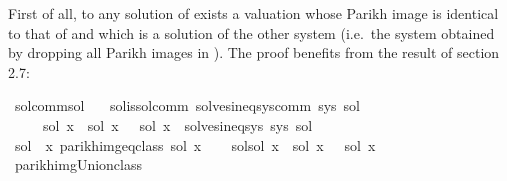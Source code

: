 \begin{isabellebody}
\begin{isamarkuptext}
First of all, to any solution  of  exists a valuation whose Parikh image is
identical to that of  and which is a solution of the other system (i.e.\ the system obtained
by dropping all Parikh images in ). The proof benefits from the result of section 2.7:%
\end{isamarkuptext}\isamarkuptrue%
\isamarkupfalse%
\ sol{\isacharunderscore}{\kern0pt}comm{\isacharunderscore}{\kern0pt}sol{\isacharcolon}{\kern0pt}\isanewline
\ \ \ sol{\isacharunderscore}{\kern0pt}is{\isacharunderscore}{\kern0pt}sol{\isacharunderscore}{\kern0pt}comm{\isacharcolon}{\kern0pt}\ {\isachardoublequoteopen}solves{\isacharunderscore}{\kern0pt}ineq{\isacharunderscore}{\kern0pt}sys{\isacharunderscore}{\kern0pt}comm\ sys\ sol{\isachardoublequoteclose}\isanewline
\ \ \ \ \ {\isachardoublequoteopen}{\isasymexists}sol{\isacharprime}{\kern0pt}{\isachardot}{\kern0pt}\ {\isacharparenleft}{\kern0pt}{\isasymforall}x{\isachardot}{\kern0pt}\ {\isasymPsi}\ {\isacharparenleft}{\kern0pt}sol\ x{\isacharparenright}{\kern0pt}\ {\isacharequal}{\kern0pt}\ {\isasymPsi}\ {\isacharparenleft}{\kern0pt}sol{\isacharprime}{\kern0pt}\ x{\isacharparenright}{\kern0pt}{\isacharparenright}{\kern0pt}\ {\isasymand}\ solves{\isacharunderscore}{\kern0pt}ineq{\isacharunderscore}{\kern0pt}sys\ sys\ sol{\isacharprime}{\kern0pt}{\isachardoublequoteclose}\isanewline
%
\isadelimproof
%
\endisadelimproof
%
\isatagproof
{}\isamarkupfalse%
\isanewline
\ \ \isamarkupfalse%
\ {\isacharquery}{\kern0pt}sol{\isacharprime}{\kern0pt}\ {\isacharequal}{\kern0pt}\ {\isachardoublequoteopen}{\isasymlambda}x{\isachardot}{\kern0pt}\ {\isasymUnion}{\isacharparenleft}{\kern0pt}parikh{\isacharunderscore}{\kern0pt}img{\isacharunderscore}{\kern0pt}eq{\isacharunderscore}{\kern0pt}class\ {\isacharparenleft}{\kern0pt}sol\ x{\isacharparenright}{\kern0pt}{\isacharparenright}{\kern0pt}{\isachardoublequoteclose}\isanewline
\ \ \isamarkupfalse%
\ sol{\isacharprime}{\kern0pt}{\isacharunderscore}{\kern0pt}sol{\isacharcolon}{\kern0pt}\ {\isachardoublequoteopen}{\isasymforall}x{\isachardot}{\kern0pt}\ {\isasymPsi}\ {\isacharparenleft}{\kern0pt}{\isacharquery}{\kern0pt}sol{\isacharprime}{\kern0pt}\ x{\isacharparenright}{\kern0pt}\ {\isacharequal}{\kern0pt}\ {\isasymPsi}\ {\isacharparenleft}{\kern0pt}sol\ x{\isacharparenright}{\kern0pt}{\isachardoublequoteclose}\isanewline
\ \ \ \ \ \ \isamarkupfalse%
\ parikh{\isacharunderscore}{\kern0pt}img{\isacharunderscore}{\kern0pt}Union{\isacharunderscore}{\kern0pt}class\ \isamarkupfalse%

\end{isabellebody}
